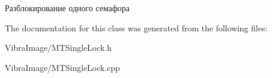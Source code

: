 Разблокирование одного семафора 



The documentation for this class was generated from the following files\+:\begin{DoxyCompactItemize}
\item 
Vibra\+Image/M\+T\+Single\+Lock.\+h\item 
Vibra\+Image/M\+T\+Single\+Lock.\+cpp\end{DoxyCompactItemize}
